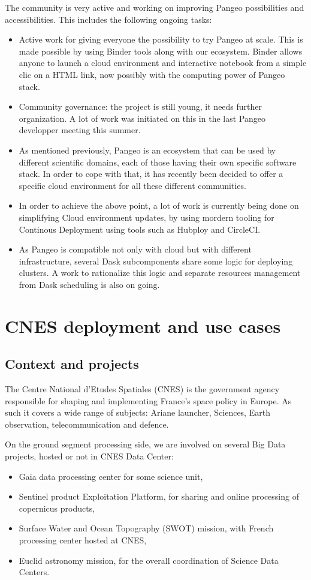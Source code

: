 \documentclass{article}
\begin{document}
The community is very active and working on improving Pangeo possibilities and accessibilities. This includes the following ongoing tasks:
\begin{itemize}
\item Active work for giving everyone the possibility to try Pangeo at scale. This is made possible by using Binder tools along with our ecosystem\cite{b8}. Binder allows anyone to launch a cloud environment and interactive notebook from a simple clic on a HTML link, now possibly with the computing power of Pangeo stack.
\item Community governance: the project is still young, it needs further organization. A lot of work was initiated on this in the last Pangeo developper meeting this summer.
\item As mentioned previously, Pangeo is an ecosystem that can be used by different scientific domains, each of those having their own specific software stack. In order to cope with that, it has recently been decided to offer a specific cloud environment for all these different communities.
\item In order to achieve the above point, a lot of work is currently being done on simplifying Cloud environment updates, by using mordern tooling for Continous Deployment using tools such as Hubploy and CircleCI.
\item As Pangeo is compatible not only with cloud but with different infrastructure, several Dask subcomponents share some logic for deploying clusters. A work to rationalize this logic and separate resources management from Dask scheduling is also on going.
\end{itemize}

\section{CNES deployment and use cases}
\label{sec:cnes}

\subsection{Context and projects}
\label{ssec:context}

The Centre National d'Etudes Spatiales (CNES) is the government agency responsible for shaping and implementing France's space policy in Europe. As such it covers a wide range of subjects: Ariane launcher, Sciences, Earth observation, telecommunication and defence.

On the ground segment processing side, we are involved on several Big Data projects, hosted or not in CNES Data Center:
\begin{itemize}
\item Gaia data processing center for some science unit,
\item Sentinel product Exploitation Platform, for sharing and online processing of copernicus products,
\item Surface Water and Ocean Topography (SWOT) mission, with French processing center hosted at CNES,
\item Euclid astronomy mission, for the overall coordination of Science Data Centers.
\end{itemize}
\end{document}
